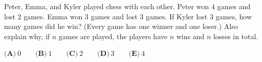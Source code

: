 Peter, Emma, and Kyler played chess with each other. Peter won $4$ games and lost $2$ games. Emma won $3$ games and lost $3$ games. If Kyler lost $3$ games, how many games did he win? (Every game has one winner and one loser.) Also explain why, if $n$ games are played, the players have $n$ wins and $n$ losses in total.

$\textbf{(A)}\ 0\qquad\textbf{(B)}\ 1\qquad\textbf{(C)}\ 2\qquad\textbf{(D)}\ 3\qquad\textbf{(E)}\ 4$
